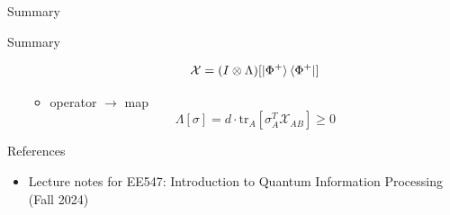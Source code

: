 \documentclass[9pt]{beamer}
\begin{document}
\begin{frame}{Summary}
\begin{block}{Summary}
\begin{itemize}
\begin{itemize}
                \begin{equation*}
                    \mathcal X = (I \otimes \Lambda) [\ket{\Phi^+}\bra{\Phi^+}]
                \end{equation*}
                \item operator $\rightarrow$ map
                \begin{equation*}
                    \Lambda [\sigma] = d \cdot \text{tr}_A [\sigma_A^T \mathcal{X}_{AB}] \ge 0
                \end{equation*}
            \end{itemize}
            \end{itemize}
        \end{block}
    \end{frame}


    \begin{frame}{References}
        \begin{itemize}
            \item Lecture notes for EE547: Introduction to Quantum Information Processing (Fall 2024)
        \end{itemize}
        \vspace{6cm}
    \end{frame}
\end{document}
